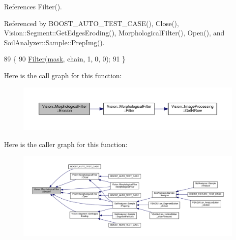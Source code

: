 References Filter().



Referenced by B\+O\+O\+S\+T\+\_\+\+A\+U\+T\+O\+\_\+\+T\+E\+S\+T\+\_\+\+C\+A\+S\+E(), Close(), Vision\+::\+Segment\+::\+Get\+Edges\+Eroding(), Morphological\+Filter(), Open(), and Soil\+Analyzer\+::\+Sample\+::\+Prep\+Img().


\begin{DoxyCode}
89     \{
90         \hyperlink{class_vision_1_1_morphological_filter_ab743062372a8d0b26dabfd27451e72ed}{Filter}(\hyperlink{_gen_blob_8m_a5d76cc2129e79ba1941d2cc2f53b9e8e}{mask}, chain, 1, 0, 0);
91     \}
\end{DoxyCode}


Here is the call graph for this function\+:\nopagebreak
\begin{figure}[H]
\begin{center}
\leavevmode
\includegraphics[width=350pt]{class_vision_1_1_morphological_filter_a62ad82519dc19be6367193a5d539c98b_cgraph}
\end{center}
\end{figure}




Here is the caller graph for this function\+:\nopagebreak
\begin{figure}[H]
\begin{center}
\leavevmode
\includegraphics[width=350pt]{class_vision_1_1_morphological_filter_a62ad82519dc19be6367193a5d539c98b_icgraph}
\end{center}
\end{figure}


\hypertarget{class_vision_1_1_morphological_filter_ab743062372a8d0b26dabfd27451e72ed}{}
